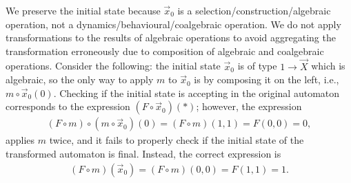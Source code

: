 We preserve the initial state because $\vec{x}_0$ is a selection/construction/algebraic operation, not a dynamics/behavioural/coalgebraic operation. We do not apply transformations to the results of algebraic operations to avoid aggregating the transformation erroneously due to composition of algebraic and coalgebraic operations. Consider the following: the initial state $\vec{x}_0$ is of type $1\rightarrow\vec{X}$ which is algebraic, so the only way to apply $m$ to $\vec{x}_0$ is by composing it on the left, i.e., $m\circ \vec{x}_0(0)$. Checking if the initial state is accepting in the original automaton corresponds to the expression $(F\circ\vec{x}_0)(*)$; however, the expression
\begin{align*}
    (F\circ m)\circ (m\circ\vec{x}_0)(0)= (F\circ m)(1,1)=F(0,0)=0,
\end{align*}
applies $m$ twice, and it fails to properly check if the initial state of the transformed automaton is final. Instead, the correct expression is 
\begin{align*}
    (F\circ m)(\vec{x}_0)= (F\circ m)(0,0)=F(1,1)=1.
\end{align*}


